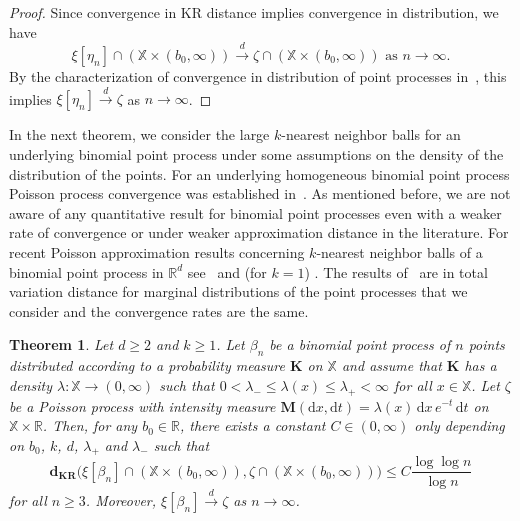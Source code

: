 \documentclass[10pt]{amsart}
\newtheorem{theo}{Theorem}[section]
\theoremstyle{definition}\newtheorem{defi}[theo]{Definition}\newtheorem{rema}[theo]{Remark}\newtheorem{exam}[theo]{Example}\newtheorem{exem}[theo]{Example}\newtheorem{nota}[theo]{Notation}
\newcommand*\bM{\mathbf{M}}
\newcommand*\bK{\mathbf{K}}
\newcommand*\dkr{\mathbf{d_{KR}}}
\newcommand*\R{\mathbb{R}}
\newcommand*\X{\mathbb{X}}
\newcommand*\md{\mathrm{d}}
\begin{document}
\begin{proof}
Since convergence in KR distance implies convergence in distribution, we have
\[
\xi[\eta_n] \cap (\X \times (b_0,\infty))\stackrel{d}{\to}\zeta \cap (\X \times (b_0,\infty))\text{ as }n\to\infty.
\]
By the characterization of convergence in distribution of point processes in~\cite[Theorem~16.16]{KallenbergFoundations}, this implies $\xi[\eta_n] \stackrel{d}{\to}\zeta $ as $n\to\infty$.
\end{proof}


In the next theorem, we consider the large $k$-nearest neighbor balls for an underlying binomial point process {under some assumptions on the density of the distribution of the points.} {For an underlying homogeneous binomial point process Poisson process convergence was established in~\cite{Penrose1997}.} As mentioned before, we are not aware of any {quantitative} result for binomial point processes even with a weaker rate of convergence or under weaker approximation distance in the literature. For recent Poisson approximation results concerning $k$-nearest neighbor balls of a binomial point process in $\R^d$ see~\cite{Chenavier2021} and (for $k=1$) \cite{GyoerfiHenzeWalk2019}. The results of~\cite{Chenavier2021} are in total variation distance for marginal distributions of the point processes that we consider and the convergence rates are the same.

\begin{theo}\label{t:knnapproxbin}
Let $d \geq 2$ and $k \geq 1$. Let $\beta_n$ be a binomial point process of $n$ points distributed according to a probability measure $\bK$ on $\X$ and assume that $\bK$ has a density $\lambda : \X \to (0,\infty)$ such that $0 < \lambda_- \le \lambda(x) \le \lambda_+ < \infty$ for all $x\in \X$. Let $\zeta$ be a Poisson process with intensity measure $\bM(\md x,\md t) = \lambda(x) \, \md x \, e^{-t} \, \md t$ on $\X \times \R$. Then, for any $b_0 \in \R$, there exists a constant $C\in(0,\infty)$ only depending on $b_0$, $k$, $d$, $\lambda_+$ and $\lambda_-$ such that
\begin{equation}\label{e:knnbinbd}
\dkr\big(\xi\left[\beta_n\right] \cap \left(\X \times \left(b_0,\infty\right)\right),\zeta \cap \left(\X \times \left(b_0,\infty\right)\right)\big) \leq C \frac{\log \log n}{\log n}
\end{equation}
for all $n\ge 3$. Moreover, $\xi[\beta_n] \stackrel{d}{\to} \zeta$ as $n \to \infty$.
\end{theo}
\end{document}
